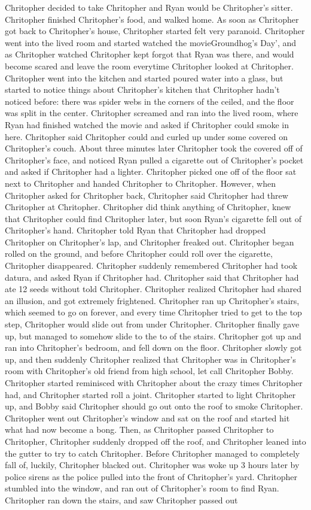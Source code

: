 \documentclass[12pt]{book}
\begin{document}
Chritopher decided to take Chritopher and Ryan would be Chritopher's sitter. Chritopher finished Chritopher's food, and walked home. As soon as Chritopher got back to Chritopher's house, Chritopher started felt very paranoid. Chritopher went into the lived room and started watched the movieGroundhog's Day', and as Chritopher watched Chritopher kept forgot that Ryan was there, and would become scared and leave the room everytime Chritopher looked at Chritopher. Chritopher went into the kitchen and started poured water into a glass, but started to notice things about Chritopher's kitchen that Chritopher hadn't noticed before: there was spider webs in the corners of the ceiled, and the floor was split in the center. Chritopher screamed and ran into the lived room, where Ryan had finished watched the movie and asked if Chritopher could smoke in here. Chritopher said Chritopher could and curled up under some covered on Chritopher's couch. About three minutes later Chritopher took the covered off of Chritopher's face, and noticed Ryan pulled a cigarette out of Chritopher's pocket and asked if Chritopher had a lighter. Chritopher picked one off of the floor sat next to Chritopher and handed Chritopher to Chritopher. However, when Chritopher asked for Chritopher back, Chritopher said Chritopher had threw Chritopher at Chritopher. Chritopher did think anything of Chritopher, knew that Chritopher could find Chritopher later, but soon Ryan's cigarette fell out of Chritopher's hand. Chritopher told Ryan that Chritopher had dropped Chritopher on Chritopher's lap, and Chritopher freaked out. Chritopher began rolled on the ground, and before Chritopher could roll over the cigarette, Chritopher disappeared. Chritopher suddenly remembered Chritopher had took datura, and asked Ryan if Chritopher had. Chritopher said that Chritopher had ate 12 seeds without told Chritopher. Chritopher realized Chritopher had shared an illusion, and got extremely frightened. Chritopher ran up Chritopher's stairs, which seemed to go on forever, and every time Chritopher tried to get to the top step, Chritopher would slide out from under Chritopher. Chritopher finally gave up, but managed to somehow slide to the to of the stairs. Chritopher got up and ran into Chritopher's bedroom, and fell down on the floor. Chritopher slowly got up, and then suddenly Chritopher realized that Chritopher was in Chritopher's room with Chritopher's old friend from high school, let call Chritopher Bobby. Chritopher started reminisced with Chritopher about the crazy times Chritopher had, and Chritopher started roll a joint. Chritopher started to light Chritopher up, and Bobby said Chritopher should go out onto the roof to smoke Chritopher. Chritopher went out Chritopher's window and sat on the roof and started hit what had now become a bong. Then, as Chritopher passed Chritopher to Chritopher, Chritopher suddenly dropped off the roof, and Chritopher leaned into the gutter to try to catch Chritopher. Before Chritopher managed to completely fall of, luckily, Chritopher blacked out. Chritopher was woke up 3 hours later by police sirens as the police pulled into the front of Chritopher's yard. Chritopher stumbled into the window, and ran out of Chritopher's room to find Ryan. Chritopher ran down the stairs, and saw Chritopher passed out 
\end{document}
